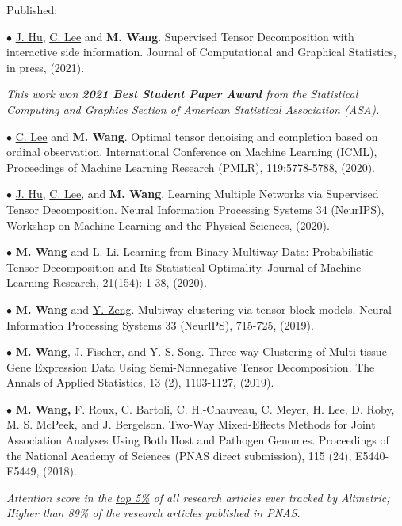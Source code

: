 \documentclass[letterpaper]{article}
\renewenvironment{itemize}{
  \begin{list}{}{
    \setlength{\leftmargin}{1.5em}
  }
}{
  \end{list}
}
\begin{document}
Published:
\begin{itemize}
\item$\bullet$ \underline{J. Hu}, \underline{C. Lee} and {\bf M. Wang}. Supervised Tensor Decomposition with interactive side information. Journal of Computational and Graphical Statistics, in press, (2021). %

{\it This work won {\bf 2021 Best Student Paper Award} from the Statistical Computing and Graphics Section of American Statistical Association (ASA). }

\item$\bullet$ \underline{C. Lee} and {\bf M. Wang}. Optimal tensor denoising and completion based on ordinal observation. International Conference on Machine Learning (ICML), Proceedings of Machine Learning Research (PMLR), 119:5778-5788, (2020). %

\item$\bullet$ \underline{J. Hu}, \underline{C. Lee}, and {\bf M. Wang}. Learning Multiple Networks via Supervised Tensor Decomposition. Neural Information Processing Systems 34 (NeurIPS), Workshop on Machine Learning and the Physical Sciences, (2020). 

\item$\bullet$ {\bf M. Wang} and L. Li. Learning from Binary Multiway Data: Probabilistic Tensor Decomposition and Its Statistical Optimality. Journal of Machine Learning Research, 21(154): 1-38, (2020).

\item$\bullet$  {\bf M. Wang} and \underline{Y. Zeng}. Multiway clustering via tensor block models. Neural Information Processing Systems 33 (NeurlPS), 715-725, (2019). 

\item$\bullet$ {\bf M. Wang}, J. Fischer, and Y. S. Song. Three-way Clustering of Multi-tissue Gene Expression Data Using Semi-Nonnegative Tensor Decomposition. The Annals of Applied Statistics, 13 (2), 1103-1127, (2019). 

\item$\bullet$ {\bf M. Wang,} F. Roux, C. Bartoli, C. H.-Chauveau, C. Meyer, H. Lee, D. Roby,  M. S. McPeek, and J. Bergelson. Two-Way Mixed-Effects Methods for Joint Association Analyses Using Both Host and Pathogen Genomes. Proceedings of the National Academy of Sciences (PNAS direct submission), 115 (24), E5440-E5449, (2018).

{\it Attention score in the \underline{top 5\%} of all research articles ever tracked by Altmetric; Higher than 89\% of the research articles published in PNAS.}


\end{itemize}
\end{document}

